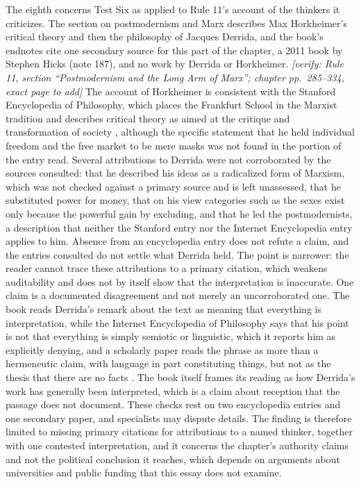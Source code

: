 \documentclass[12pt]{article}
\newif\ifverify\verifytrue
\newcommand{\passage}[1]{\ifverify{\footnotesize\color{gray}\textit{[verify: #1]}}\fi}
\begin{document}
The eighth concerns Test Six as applied to Rule 11's account of the thinkers it criticizes. The section on postmodernism and Marx describes Max Horkheimer's critical theory and then the philosophy of Jacques Derrida, and the book's endnotes cite one secondary source for this part of the chapter, a 2011 book by Stephen Hicks (note 187), and no work by Derrida or Horkheimer. \passage{Rule 11, section ``Postmodernism and the Long Arm of Marx''; chapter pp.~285--334, exact page to add} The account of Horkheimer is consistent with the Stanford Encyclopedia of Philosophy, which places the Frankfurt School in the Marxist tradition and describes critical theory as aimed at the critique and transformation of society \cite{flynn2023}, although the specific statement that he held individual freedom and the free market to be mere masks was not found in the portion of the entry read. Several attributions to Derrida were not corroborated by the sources consulted: that he described his ideas as a radicalized form of Marxism, which was not checked against a primary source and is left unassessed, that he substituted power for money, that on his view categories such as the sexes exist only because the powerful gain by excluding, and that he led the postmodernists, a description that neither the Stanford entry \cite{lawlor2021} nor the Internet Encyclopedia entry \cite{reynolds} applies to him. Absence from an encyclopedia entry does not refute a claim, and the entries consulted do not settle what Derrida held. The point is narrower: the reader cannot trace these attributions to a primary citation, which weakens auditability and does not by itself show that the interpretation is inaccurate. One claim is a documented disagreement and not merely an uncorroborated one. The book reads Derrida's remark about the text as meaning that everything is interpretation, while the Internet Encyclopedia of Philosophy says that his point is not that everything is simply semiotic or linguistic, which it reports him as explicitly denying, and a scholarly paper reads the phrase as more than a hermeneutic claim, with language in part constituting things, but not as the thesis that there are no facts \cite{bush2009}. The book itself frames its reading as how Derrida's work has generally been interpreted, which is a claim about reception that the passage does not document. These checks rest on two encyclopedia entries and one secondary paper, and specialists may dispute details. The finding is therefore limited to missing primary citations for attributions to a named thinker, together with one contested interpretation, and it concerns the chapter's authority claims and not the political conclusion it reaches, which depends on arguments about universities and public funding that this essay does not examine.
\end{document}
